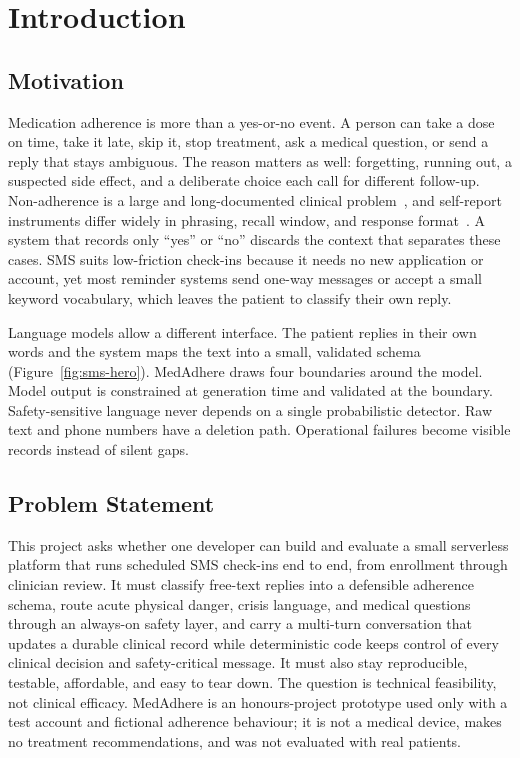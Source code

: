 \chapter{Introduction}
\label{ch:introduction}

\section{Motivation}

Medication adherence is more than a yes-or-no event. A person can take a dose
on time, take it late, skip it, stop treatment, ask a medical question, or send
a reply that stays ambiguous. The reason matters as well: forgetting, running
out, a suspected side effect, and a deliberate choice each call for different
follow-up. Non-adherence is a large and long-documented clinical
problem~\cite{osterberg2005adherence}, and self-report instruments differ widely
in phrasing, recall window, and response format~\cite{stirratt2015selfreport}.
A system that records only ``yes'' or ``no'' discards the context that
separates these cases. SMS suits low-friction check-ins because it needs no new
application or account, yet most reminder systems send one-way messages or accept a small
keyword vocabulary, which leaves the patient to classify their own reply.

Language models allow a different interface. The patient replies in their own
words and the system maps the text into a small, validated schema
(Figure~\ref{fig:sms-hero}). MedAdhere draws four boundaries around the model. Model output is constrained at
generation time and validated at the boundary. Safety-sensitive language never
depends on a single probabilistic detector. Raw text and phone numbers have a
deletion path. Operational failures become visible records instead of silent
gaps.



\section{Problem Statement}

This project asks whether one developer can build and evaluate a small
serverless platform that runs scheduled SMS check-ins end to end, from
enrollment through clinician review. It must classify free-text replies into a
defensible adherence schema, route acute physical danger, crisis language, and
medical questions through an always-on safety layer, and carry a multi-turn
conversation that updates a durable clinical record while deterministic code
keeps control of every clinical decision and safety-critical message. It must
also stay reproducible, testable, affordable, and easy to tear down. The
question is technical feasibility, not clinical efficacy. MedAdhere is an
honours-project prototype used only with a test account and fictional adherence
behaviour; it is not a medical device, makes no treatment recommendations, and
was not evaluated with real patients.

